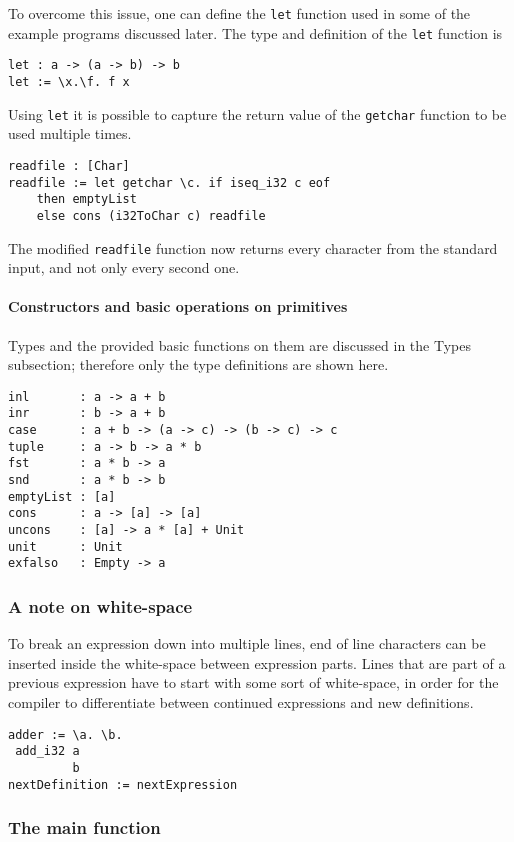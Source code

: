 \documentclass[12pt]{article}
\begin{document}
To overcome this issue, one can define the \verb$let$ function used in some of
the example programs discussed later. The type and definition of the \verb$let$
function is
\begin{lstlisting}
let : a -> (a -> b) -> b
let := \x.\f. f x
\end{lstlisting}
Using \verb$let$ it is possible to capture the return value of the
\verb$getchar$ function to be used multiple times.
\begin{lstlisting}
readfile : [Char]
readfile := let getchar \c. if iseq_i32 c eof 
    then emptyList 
    else cons (i32ToChar c) readfile
\end{lstlisting}
The modified \verb$readfile$ function now returns every character from the
standard input, and not only every second one.

\paragraph{Constructors and basic operations on primitives} Types and the
provided basic functions on them are discussed in the Types subsection;
therefore only the type definitions are shown here.
\begin{lstlisting}
inl       : a -> a + b
inr       : b -> a + b
case      : a + b -> (a -> c) -> (b -> c) -> c
tuple     : a -> b -> a * b
fst       : a * b -> a
snd       : a * b -> b
emptyList : [a]
cons      : a -> [a] -> [a]
uncons    : [a] -> a * [a] + Unit
unit      : Unit
exfalso   : Empty -> a
\end{lstlisting}

\subsubsection{A note on white-space}

To break an expression down into multiple lines, end of line characters can be
inserted inside the white-space between expression parts. Lines that are part of
a previous expression have to start with some sort of white-space, in order for
the compiler to differentiate between continued expressions and new definitions.
\lstset{showspaces=true}
\begin{lstlisting}
adder := \a. \b.
 add_i32 a
         b
nextDefinition := nextExpression
\end{lstlisting}
\lstset{showspaces=false}

\subsubsection{The main function}
\end{document}
